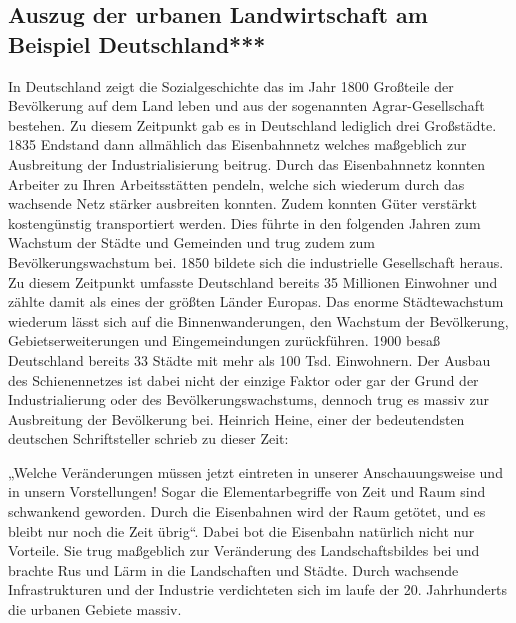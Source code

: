 \documentclass{scrartcl}
\begin{document}
\subsection{Auszug der urbanen Landwirtschaft am Beispiel Deutschland***}
In Deutschland zeigt die Sozialgeschichte das im Jahr 1800 Großteile der Bevölkerung auf dem Land leben und aus der sogenannten Agrar-Gesellschaft bestehen. Zu diesem Zeitpunkt gab es in Deutschland lediglich drei Großstädte. 1835 Endstand dann allmählich das Eisenbahnnetz welches maßgeblich zur Ausbreitung der Industrialisierung beitrug. Durch das Eisenbahnnetz konnten Arbeiter zu Ihren Arbeitsstätten pendeln, welche sich wiederum durch das wachsende Netz stärker ausbreiten konnten. Zudem konnten Güter verstärkt kostengünstig transportiert werden. Dies führte in den folgenden Jahren zum Wachstum der Städte und Gemeinden und trug zudem zum Bevölkerungswachstum bei. 1850 bildete sich die industrielle Gesellschaft heraus. Zu diesem Zeitpunkt umfasste Deutschland bereits 35 Millionen Einwohner und zählte damit als eines der größten Länder Europas. Das enorme Städtewachstum wiederum lässt sich auf die Binnenwanderungen, den Wachstum der Bevölkerung, Gebietserweiterungen und Eingemeindungen zurückführen. 1900 besaß Deutschland bereits 33 Städte mit mehr als 100 Tsd. Einwohnern. Der Ausbau des Schienennetzes ist dabei nicht der einzige Faktor oder gar der Grund der Industrialierung oder des Bevölkerungswachstums, dennoch trug es massiv zur Ausbreitung der Bevölkerung bei. Heinrich Heine, einer der bedeutendsten deutschen Schriftsteller schrieb zu dieser Zeit:

„Welche Veränderungen müssen jetzt eintreten in unserer Anschauungsweise und in unsern Vorstellungen! Sogar die Elementarbegriffe von Zeit und Raum sind schwankend geworden. Durch die Eisenbahnen wird der Raum getötet, und es bleibt nur noch die Zeit übrig“. Dabei bot die Eisenbahn natürlich nicht nur Vorteile. Sie trug maßgeblich zur Veränderung des Landschaftsbildes bei und brachte Rus und Lärm in die Landschaften und Städte. Durch wachsende Infrastrukturen und der Industrie verdichteten sich im laufe der 20. Jahrhunderts die urbanen Gebiete massiv.
\end{document}
